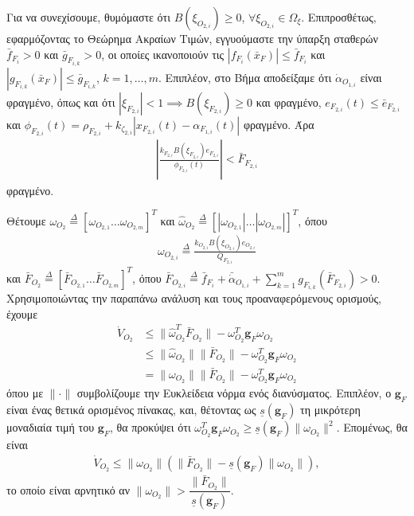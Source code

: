 \begin{proof_of_theorem}
\begin{step}
\bigskip
Για να συνεχίσουμε, θυμόμαστε ότι $B(\xi_{O_{2,i}}) \geq 0$, $\forall \xi_{O_{2,i}}\in \Omega_{\xi}$. Επιπροσθέτως, εφαρμόζοντας το Θεώρημα Ακραίων Τιμών, εγγυούμαστε την ύπαρξη σταθερών $\bar{f}_{F_{i}}>0$ και $\bar{g}_{F_{i,k}}>0$, οι οποίες ικανοποιούν τις $\left|f_{F_{i}}(\bar{x}_{F})\right|\leq\bar{f}_{F_{i}}$ και $\left|g_{F_{i,k}}(\bar{x}_{F})\right|\leq\bar{g}_{F_{i,k}}$, $k=1,\ldots,m$. Επιπλέον, στο Βήμα  αποδείξαμε ότι $\dot{\alpha}_{O_{1,i}}$ είναι φραγμένο, όπως και ότι $|\xi_{F_{2, i}}| < 1 \implies B(\xi_{F_{2, i}}) \geq 0$ και φραγμένο, $e_{F_{2, i}}(t) \leq \bar{e}_{F_{2, i}}$ και $\phi_{F_{2, i}}(t) = \rho_{F_{2, i}} + k_{\zeta_{2, i}}|x_{F_{2,i}}(t) - \alpha_{F_{1, i}}(t)|$ φραγμένο.
Άρα
\begin{align}
\left|\frac{k_{F_{2,i}}B(\xi_{F_{2,i}})e_{F_{2,i}}}{\phi_{F_{2,i}}(t)}\right| < \bar{F}_{F_{2, i}}
\end{align}
φραγμένο.

Θέτουμε $\omega_{O_{2}} \stackrel{\Delta}{=} [ \omega_{O_{2,1}} \ldots \omega_{O_{2,m}}]^{T}$ και $\hat{\omega}_{O_{2}} \stackrel{\Delta}{=} [\left| \omega_{O_{2,1}}\right| \ldots \left| \omega_{O_{2,m}}\right|]^{T}$, όπου
\begin{align*}
\omega_{O_{2,i}} \stackrel{\Delta}{=} \frac{k_{O_{2,i}}B(\xi_{O_{2,i}})e_{O_{2,i}}}{Q_{F_{2,i}}}
\end{align*}
και $\bar{F}_{O_{2}} \stackrel{\Delta}{=} [\bar{F}_{O_{2,1}} \ldots \bar{F}_{O_{2,m}}]^{T}$, όπου $\bar{F}_{O_{2,i}} \stackrel{\Delta}{=} \bar{f}_{F_{i}} + \bar{\dot{\alpha}}_{O_{1,i}} + \sum_{k=1}^{m}g_{F_{i,k}}(\bar{F}_{F_{2, i}})>0$. Χρησιμοποιώντας την παραπάνω ανάλυση και τους προαναφερόμενους ορισμούς, έχουμε
\begin{align*}
\dot{V}_{O_{2}} &\leq \| \hat{\omega}^{T}_{O_{2}}\bar{F}_{O_{2}} \| - \omega^{T}_{O_{2}}\mathbf{g}_{F}\omega_{O_{2}} \\
&\leq \| \hat{\omega}_{O_{2}} \| \| \bar{F}_{O_{2}} \| - \omega^{T}_{O_{2}}\mathbf{g}_{F}\omega_{O_{2}} \\
&= \| \omega_{O_{2}} \| \| \bar{F}_{O_{2}} \| - \omega^{T}_{O_{2}}\mathbf{g}_{F}\omega_{O_{2}}
\end{align*}
όπου με $\|\cdot\|$ συμβολίζουμε την Ευκλείδεια νόρμα ενός διανύσματος. Επιπλέον, ο $\mathbf{g}_{F}$ είναι ένας θετικά ορισμένος πίνακας, και, θέτοντας ως $\underline{s}(\mathbf{g}_{F})$ τη μικρότερη μοναδιαία τιμή του $\mathbf{g}_{F}$, θα προκύψει ότι  $\omega^{T}_{O_{2}}\mathbf{g}_{F}\omega_{O_{2}} \geq \underline{s}(\mathbf{g}_{F})\| \omega_{O_{2}} \|^{2}$. Επομένως, θα είναι
\begin{align*}
\dot{V}_{O_{2}} \leq \| \omega_{O_{2}} \| \left( \| \bar{F}_{O_{2}} \| - \underline{s}(\mathbf{g}_{F}) \| \omega_{O_{2}} \| \right),
\end{align*}
το οποίο είναι αρνητικό αν $\| \omega_{O_{2}} \| > \dfrac{\| \bar{F}_{O_{2}} \|}{\underline{s}(\mathbf{g}_{F})}$.


\end{step}
\end{proof_of_theorem}

